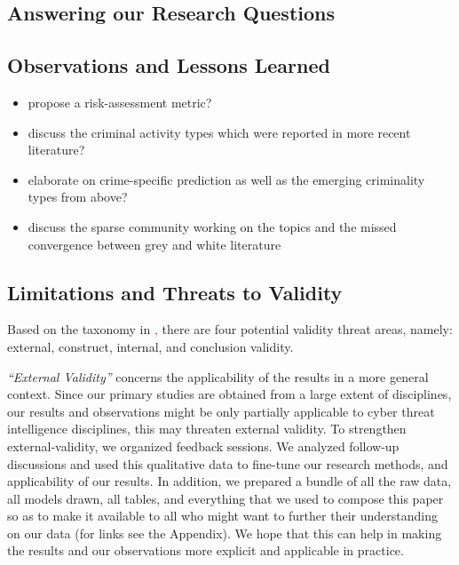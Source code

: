 \subsection{Answering our Research Questions}


\subsection{Observations and Lessons Learned}

\begin{itemize}
\item propose a risk-assessment metric?
\item discuss the criminal activity types which were reported in more recent literature?
\item elaborate on crime-specific prediction as well as the emerging criminality types from above?
\item discuss the sparse community working on the topics and the missed convergence between grey and white literature
\end{itemize}

\subsection{Limitations and Threats to Validity}

Based on the taxonomy in \textcolor{red}{\cite{wohlin}, }there are four potential validity threat areas, namely: external, construct, internal, and conclusion validity. 

\emph{ ``External Validity''} concerns the applicability of the results in a more general context. Since our primary studies are obtained from a large extent of disciplines, our results and observations might be only partially applicable to cyber threat intelligence disciplines, this may threaten external validity. To strengthen external-validity, we organized feedback sessions. We analyzed follow-up discussions and used this qualitative data to fine-tune our research methods, and applicability of our results. In addition, we prepared a bundle of all the raw data, all models drawn, all tables, and everything that we used to compose this paper so as to make it available to all who might want to further their understanding on our data (for links see the Appendix). We hope that this can help in making the results and our observations more explicit and applicable in practice.


